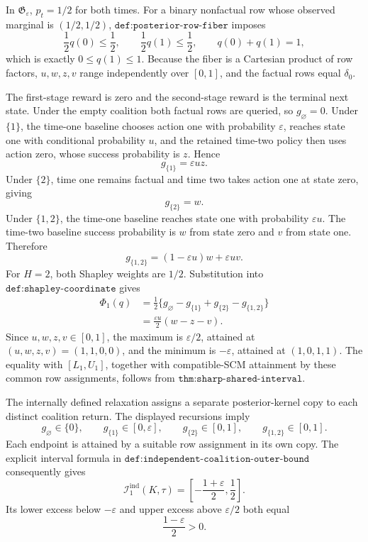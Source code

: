 In \(\mathfrak G_\varepsilon\), \(p_t=1/2\) for both times.  For a binary nonfactual row whose observed marginal is \((1/2,1/2)\), \(\texttt{def:posterior-row-fiber}\) imposes
\[
 \frac12q(0)\le\frac12,
 \qquad
 \frac12q(1)\le\frac12,
 \qquad
 q(0)+q(1)=1,
\]
which is exactly \(0\le q(1)\le1\).  Because the fiber is a Cartesian product of row factors, \(u,w,z,v\) range independently over \([0,1]\), and the factual rows equal \(\delta_0\).

The first-stage reward is zero and the second-stage reward is the terminal next state.  Under the empty coalition both factual rows are queried, so \(g_\varnothing=0\).  Under \(\{1\}\), the time-one baseline chooses action one with probability \(\varepsilon\), reaches state one with conditional probability \(u\), and the retained time-two policy then uses action zero, whose success probability is \(z\).  Hence
\[
 g_{\{1\}}=\varepsilon uz.
\]
Under \(\{2\}\), time one remains factual and time two takes action one at state zero, giving
\[
 g_{\{2\}}=w.
\]
Under \(\{1,2\}\), the time-one baseline reaches state one with probability \(\varepsilon u\).  The time-two baseline success probability is \(w\) from state zero and \(v\) from state one.  Therefore
\[
 g_{\{1,2\}}=(1-\varepsilon u)w+\varepsilon uv.
\]
For \(H=2\), both Shapley weights are \(1/2\).  Substitution into \(\texttt{def:shapley-coordinate}\) gives
\[
\begin{aligned}
 \Phi_1(q)
 &=\frac12\{g_\varnothing-g_{\{1\}}+g_{\{2\}}-g_{\{1,2\}}\}\\
 &=\frac{\varepsilon u}{2}(w-z-v).
\end{aligned}
\]
Since \(u,w,z,v\in[0,1]\), the maximum is \(\varepsilon/2\), attained at \((u,w,z,v)=(1,1,0,0)\), and the minimum is \(-\varepsilon\), attained at \((1,0,1,1)\).  The equality with \([L_1,U_1]\), together with compatible-SCM attainment by these common row assignments, follows from \(\texttt{thm:sharp-shared-interval}\).

The internally defined relaxation assigns a separate posterior-kernel copy to each distinct coalition return.  The displayed recursions imply
\[
 g_\varnothing\in\{0\},
 \qquad
 g_{\{1\}}\in[0,\varepsilon],
 \qquad
 g_{\{2\}}\in[0,1],
 \qquad
 g_{\{1,2\}}\in[0,1].
\]
Each endpoint is attained by a suitable row assignment in its own copy.  The explicit interval formula in \(\texttt{def:independent-coalition-outer-bound}\) consequently gives
\[
 \mathcal I_1^{\mathrm{ind}}(K,\tau)
 =\left[-\frac{1+\varepsilon}{2},\frac12\right].
\]
Its lower excess below \(-\varepsilon\) and upper excess above \(\varepsilon/2\) both equal
\[
 \frac{1-\varepsilon}{2}>0.
\]

